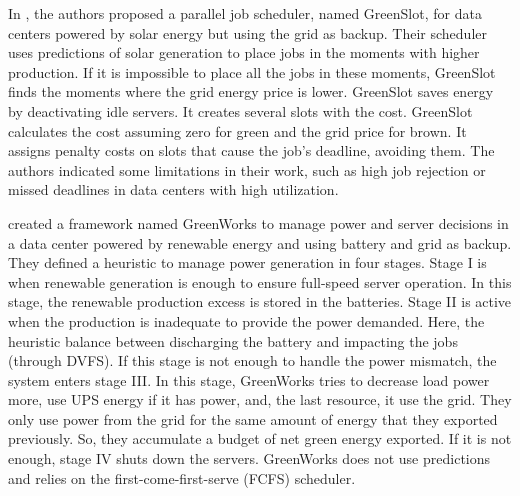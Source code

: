 In \cite{goiri2015matching}, the authors proposed a parallel job scheduler, named GreenSlot, for data centers powered by solar energy but using the grid as backup. Their scheduler uses predictions of solar generation to place jobs in the moments with higher production. If it is impossible to place all the jobs in these moments, GreenSlot finds the moments where the grid energy price is lower. GreenSlot saves energy by deactivating idle servers. It creates several slots with the cost. GreenSlot calculates the cost assuming zero for green and the grid price for brown. It assigns penalty costs on slots that cause the job's deadline, avoiding them. The authors indicated some limitations in their work, such as high job rejection or missed deadlines in data centers with high utilization.

\citeauthor{li2016managing} \cite{li2016managing} created a framework named GreenWorks to manage power and server decisions in a data center powered by renewable energy and using battery and grid as backup. They defined a heuristic to manage power generation in four stages. Stage I is when renewable generation is enough to ensure full-speed server operation. In this stage, the renewable production excess is stored in the batteries. Stage II is active when the production is inadequate to provide the power demanded. Here, the heuristic balance between discharging the battery and impacting the jobs (through DVFS). If this stage is not enough to handle the power mismatch, the system enters stage III. In this stage, GreenWorks tries to decrease load power more, use UPS energy if it has power, and, the last resource, it use the grid. They only use power from the grid for the same amount of energy that they exported previously. So, they accumulate a budget of net green energy exported. If it is not enough, stage IV shuts down the servers. GreenWorks does not use predictions and relies on the first-come-first-serve (FCFS) scheduler.

